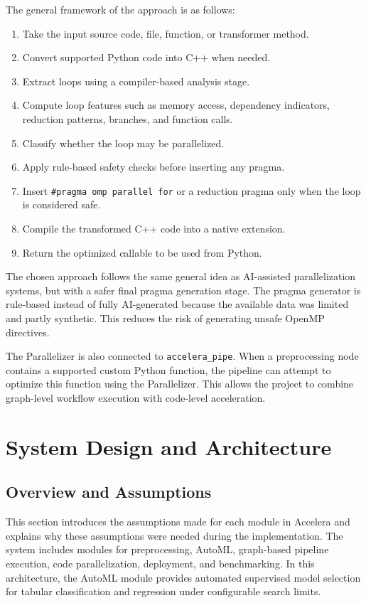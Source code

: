 \documentclass[12pt,a4paper]{report}
\begin{document}
The general framework of the approach is as follows:
\begin{enumerate}
  \item Take the input source code, file, function, or transformer method.
  \item Convert supported Python code into C++ when needed.
  \item Extract loops using a compiler-based analysis stage.
  \item Compute loop features such as memory access, dependency indicators,
  reduction patterns, branches, and function calls.
  \item Classify whether the loop may be parallelized.
  \item Apply rule-based safety checks before inserting any pragma.
  \item Insert \texttt{\#pragma omp parallel for} or a reduction pragma only
  when the loop is considered safe.
  \item Compile the transformed C++ code into a native extension.
  \item Return the optimized callable to be used from Python.
\end{enumerate}

\noindent The chosen approach follows the same general idea as AI-assisted
parallelization systems, but with a safer final pragma generation stage. The
pragma generator is rule-based instead of fully AI-generated because the
available data was limited and partly synthetic. This reduces the risk of
generating unsafe OpenMP directives.

\noindent The Parallelizer is also connected to \texttt{accelera\_pipe}. When a
preprocessing node contains a supported custom Python function, the pipeline can
attempt to optimize this function using the Parallelizer. This allows the
project to combine graph-level workflow execution with code-level acceleration.


\chapter{System Design and Architecture}
\section{Overview and Assumptions}
This section introduces the assumptions made for each module in Accelera and
explains why these assumptions were needed during the implementation.
The system includes modules for preprocessing, AutoML, graph-based pipeline
execution, code parallelization, deployment, and benchmarking. In this
architecture, the AutoML module provides automated supervised model selection
for tabular classification and regression under configurable search limits.
\end{document}

